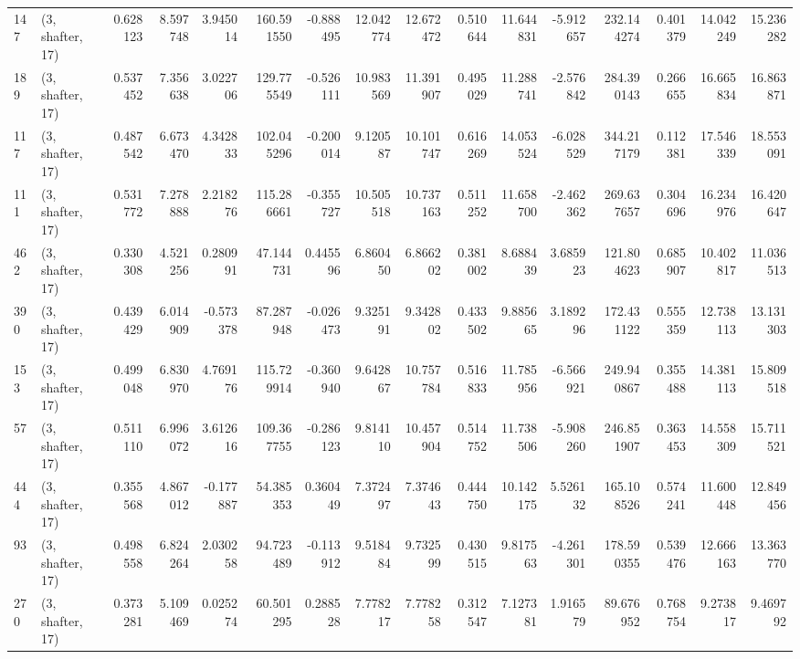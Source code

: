 \begin{tabular}{llrrrrrrrrrrrrrr}
147 &  (3, shafter, 17) &   0.628123 &   8.597748 &   3.945014 &   160.591550 &  -0.888495 &  12.042774 &  12.672472 &  0.510644 &  11.644831 &  -5.912657 &   232.144274 &  0.401379 &  14.042249 &  15.236282 \\
189 &  (3, shafter, 17) &   0.537452 &   7.356638 &   3.022706 &   129.775549 &  -0.526111 &  10.983569 &  11.391907 &  0.495029 &  11.288741 &  -2.576842 &   284.390143 &  0.266655 &  16.665834 &  16.863871 \\
117 &  (3, shafter, 17) &   0.487542 &   6.673470 &   4.342833 &   102.045296 &  -0.200014 &   9.120587 &  10.101747 &  0.616269 &  14.053524 &  -6.028529 &   344.217179 &  0.112381 &  17.546339 &  18.553091 \\
111 &  (3, shafter, 17) &   0.531772 &   7.278888 &   2.218276 &   115.286661 &  -0.355727 &  10.505518 &  10.737163 &  0.511252 &  11.658700 &  -2.462362 &   269.637657 &  0.304696 &  16.234976 &  16.420647 \\
462 &  (3, shafter, 17) &   0.330308 &   4.521256 &   0.280991 &    47.144731 &   0.445596 &   6.860450 &   6.866202 &  0.381002 &   8.688439 &   3.685923 &   121.804623 &  0.685907 &  10.402817 &  11.036513 \\
390 &  (3, shafter, 17) &   0.439429 &   6.014909 &  -0.573378 &    87.287948 &  -0.026473 &   9.325191 &   9.342802 &  0.433502 &   9.885665 &   3.189296 &   172.431122 &  0.555359 &  12.738113 &  13.131303 \\
153 &  (3, shafter, 17) &   0.499048 &   6.830970 &   4.769176 &   115.729914 &  -0.360940 &   9.642867 &  10.757784 &  0.516833 &  11.785956 &  -6.566921 &   249.940867 &  0.355488 &  14.381113 &  15.809518 \\
57  &  (3, shafter, 17) &   0.511110 &   6.996072 &   3.612616 &   109.367755 &  -0.286123 &   9.814110 &  10.457904 &  0.514752 &  11.738506 &  -5.908260 &   246.851907 &  0.363453 &  14.558309 &  15.711521 \\
444 &  (3, shafter, 17) &   0.355568 &   4.867012 &  -0.177887 &    54.385353 &   0.360449 &   7.372497 &   7.374643 &  0.444750 &  10.142175 &   5.526132 &   165.108526 &  0.574241 &  11.600448 &  12.849456 \\
93  &  (3, shafter, 17) &   0.498558 &   6.824264 &   2.030258 &    94.723489 &  -0.113912 &   9.518484 &   9.732599 &  0.430515 &   9.817563 &  -4.261301 &   178.590355 &  0.539476 &  12.666163 &  13.363770 \\
270 &  (3, shafter, 17) &   0.373281 &   5.109469 &   0.025274 &    60.501295 &   0.288528 &   7.778217 &   7.778258 &  0.312547 &   7.127381 &   1.916579 &    89.676952 &  0.768754 &   9.273817 &   9.469792 \\

\end{tabular}

